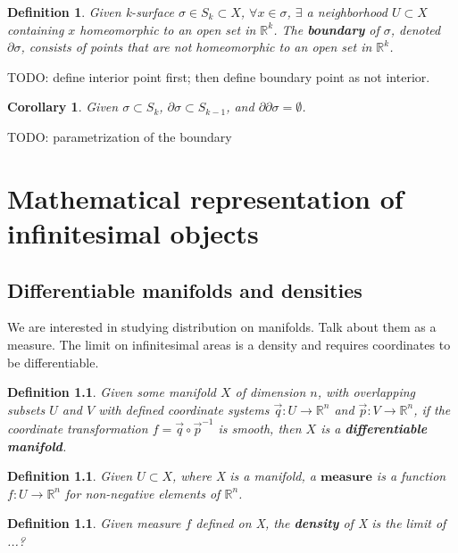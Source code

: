 \documentclass{book}
\newtheorem{defn}[equation]{Definition}
\newtheorem{coro}[equation]{Corollary}
\begin{document}
\begin{defn}
	Given k-surface $\sigma \in S_k \subset X$, $\forall x \in \sigma$, $\exists$ a neighborhood $U \subset X$ containing $x$ homeomorphic to an open set in $\mathbb{R}^k$. The \textbf{boundary} of $\sigma$, denoted $\partial\sigma$, consists of points that are not homeomorphic to an open set in $\mathbb{R}^k$. 
\end{defn}

TODO: define interior point first; then define boundary point as not interior.

\begin{coro}
	Given $\sigma \subset S_k$, $\partial\sigma \subset S_{k-1}$, and $\partial\partial\sigma = \emptyset$. 
\end{coro}

TODO: parametrization of the boundary	





\chapter{Mathematical representation of infinitesimal objects}



\section{Differentiable manifolds and densities}
We are interested in studying distribution on manifolds. Talk about them as a measure. The limit on infinitesimal areas is a density and requires coordinates to be differentiable.


\begin{defn}
	Given some manifold $X$ of dimension $n$, with overlapping subsets $U$ and $V$ with defined coordinate systems $\vec{q}: U \to \mathbb{R}^n$ and $\vec{p}: V \to \mathbb{R}^n$, if the coordinate transformation $f = \vec{q} \circ \vec{p}^{-1}$ is smooth, then $X$ is a \textbf{differentiable manifold}. 
\end{defn}

\begin{defn}
	Given $U \subset X$, where X is a manifold, a $\textbf{measure}$ is a function $f : U \to \mathbb{R}^n$ for non-negative elements of $\mathbb{R}^n$. 
\end{defn}

\begin{defn}
	Given measure $f$ defined on X, the \textbf{density} of X is the limit of ...?
\end{defn}
\end{document}
